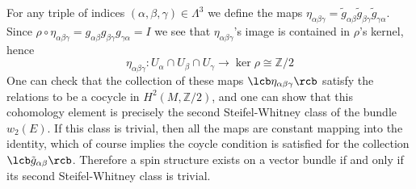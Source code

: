 For any triple of indices $(\alpha,\beta,\gamma) \in \Lambda^3$ we define the maps $\eta_{\alpha\beta\gamma} = \tilde{g}_{\alpha\beta} \tilde{g}_{\beta\gamma} \tilde{g}_{\gamma\alpha}$. Since $\rho \circ \eta_{\alpha\beta\gamma} = g_{\alpha\beta} g_{\beta\gamma} g_{\gamma\alpha} = I$ we see that $\eta_{\alpha\beta\gamma}$'s image is contained in $\rho$'s kernel, hence
\[ \eta_{\alpha\beta\gamma} : U_\alpha \cap U_\beta \cap U_\gamma \rightarrow \ker \rho \cong \mathbb Z/2 \]
One can check that the collection of these maps $\lcb \eta_{\alpha\beta\gamma} \rcb$ satisfy the relations to be a \Cech cocycle in $H^2(M,\mathbb Z/2)$, and one can show that this cohomology element is precisely the second Steifel-Whitney class of the bundle $w_2(E)$. If this class is trivial, then all the maps are constant mapping into the identity, which of course implies the coycle condition is satisfied for the collection $\lcb \tilde{g}_{\alpha\beta} \rcb$. Therefore a spin structure exists on a vector bundle if and only if its second Steifel-Whitney class is trivial.

